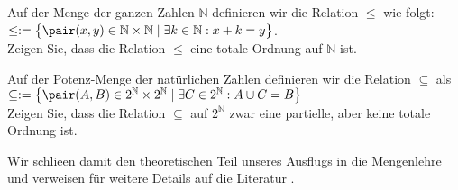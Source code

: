 \exercise
Auf der Menge der ganzen Zahlen $\mathbb{N}$ definieren wir die Relation $\leq$ 
wie folgt: 
\\[0.2cm]
\hspace*{1.3cm}
$\leq := \bigl\{ \pair(x,y) \in \mathbb{N} \times \mathbb{N} \mid \exists k \in \mathbb{N}: x + k = y \bigr\}$.
\\[0.2cm]
Zeigen Sie, dass die Relation $\leq$ eine totale Ordnung auf $\mathbb{N}$ ist.
\exend

\exercise
Auf der Potenz-Menge der nat\"{u}rlichen Zahlen definieren wir die Relation
$\subseteq$ als 
\\[0.2cm]
\hspace*{1.3cm}
$\subseteq := 
\bigl\{ \pair(A,B) \in 2^\mathbb{N} \times 2^\mathbb{N}\mid \exists C \in 2^\mathbb{N}: A \cup C = B \bigr\}$
\\[0.2cm]
Zeigen Sie, dass die Relation $\subseteq$ auf $2^\mathbb{N}$ zwar eine partielle, aber keine
totale Ordnung ist.
\exend
\next

\noindent
Wir schlie\3en damit den theoretischen Teil unseres Ausflugs in die Mengenlehre und verweisen f\"{u}r weitere
Details auf die Literatur \cite{lipschutz:1998}.  

